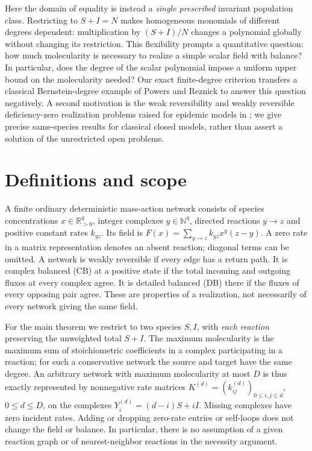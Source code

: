 \documentclass[11pt]{article}
\newcommand{\RR}{\mathbb R}
\newcommand{\NN}{\mathbb N}
\begin{document}
Here the domain of equality is instead a \emph{single prescribed} invariant population class. Restricting to $S+I=N$ makes homogeneous monomials of different degrees dependent: multiplication by $(S+I)/N$ changes a polynomial globally without changing its restriction. This flexibility prompts a quantitative question: how much molecularity is necessary to realize a simple scalar field with balance? In particular, does the degree of the scalar polynomial impose a uniform upper bound on the molecularity needed? Our exact finite-degree criterion transfers a classical Bernstein-degree example of Powers and Reznick \cite{powersreznick2000} to answer this question negatively. A second motivation is the weak reversibility and weakly reversible deficiency-zero realization problems raised for epidemic models in \cite{avram24}; we give precise same-species results for classical closed models, rather than assert a solution of the unrestricted open problems.

\section{Definitions and scope}
A finite ordinary deterministic mass-action network consists of species concentrations $x\in\RR_{>0}^q$, integer complexes $y\in\NN^q$, directed reactions $y\to z$ and positive constant rates $k_{yz}$. Its field is $F(x)=\sum_{y\to z}k_{yz}x^y(z-y)$. A zero rate in a matrix representation denotes an absent reaction; diagonal terms can be omitted. A network is weakly reversible if every edge has a return path. It is complex balanced (CB) at a positive state if the total incoming and outgoing fluxes at every complex agree. It is detailed balanced (DB) there if the fluxes of every opposing pair agree. These are properties of a realization, not necessarily of every network giving the same field.

For the main theorem we restrict to two species $S,I$, with \emph{each reaction} preserving the unweighted total $S+I$. The maximum molecularity is the maximum sum of stoichiometric coefficients in a complex participating in a reaction; for such a conservative network the source and target have the same degree. An arbitrary network with maximum molecularity at most $D$ is thus exactly represented by nonnegative rate matrices $K^{(d)}=(k_{ij}^{(d)})_{0\leq i,j\leq d}$, $0\leq d\leq D$, on the complexes $Y_i^{(d)}=(d-i)S+iI$. Missing complexes have zero incident rates. Adding or dropping zero-rate entries or self-loops does not change the field or balance. In particular, there is no assumption of a given reaction graph or of nearest-neighbor reactions in the necessity argument.
\end{document}
